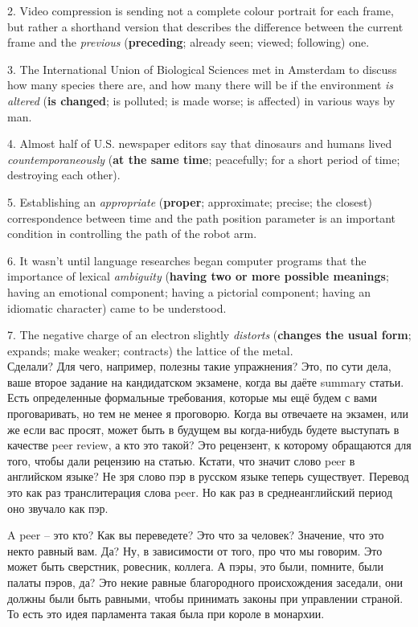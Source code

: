 \documentclass[main.tex]{subfiles}
\begin{document}
2. Video compression is sending not a complete colour portrait for each frame, but rather a shorthand version that describes the difference between the current frame and the \textit{previous} (\textbf{preceding}; already seen; viewed; following) one.

3. The International Union of Biological Sciences met in Amsterdam to discuss how many species there are, and how many there will be if the environment \textit{is altered} (\textbf{is changed}; is polluted; is made worse; is affected) in various ways by man. 

4. Almost half of U.S. newspaper editors say that dinosaurs and humans lived \textit{countemporaneously} (\textbf{at the same time}; peacefully; for a short period of time; destroying each other).

5. Establishing an \textit{appropriate} (\textbf{proper}; approximate; precise; the closest) correspondence between time and the path position parameter is an important condition in controlling the path of the robot arm.

6. It wasn't until language researches began computer programs that the importance of lexical \textit{ambiguity} (\textbf{having two or more possible meanings}; having an emotional component; having a pictorial component; having an idiomatic character) came to be understood.

7. The negative charge of an electron slightly \textit{distorts} (\textbf{changes the usual form}; expands; make weaker; contracts) the lattice of the metal.
\\

Сделали?
Для чего, например, полезны такие упражнения?
Это, по сути дела, ваше второе задание на кандидатском экзамене, когда вы даёте summary статьи.
Есть определенные формальные требования, которые мы ещё будем с вами проговаривать, но тем не менее я проговорю.
Когда вы отвечаете на экзамен, или же если вас просят, может быть в будущем вы когда-нибудь будете выступать в качестве peer review, а кто это такой?
Это рецензент, к которому обращаются для того, чтобы дали рецензию на статью.
Кстати, что значит слово peer в английском языке?
Не зря слово пэр в русском языке теперь существует.
Перевод это как раз транслитерация слова peer.
Но как раз в среднеанглийский период оно звучало как пэр.

A peer -- это кто?
Как вы переведете?
Это что за человек?
Значение, что это некто равный вам.
Да?
Ну, в зависимости от того, про что мы говорим.
Это может быть сверстник, ровесник, коллега.
А пэры, это были, помните, были палаты пэров, да?
Это некие равные благородного происхождения заседали, они должны были быть равными, чтобы принимать законы при управлении страной.
То есть это идея парламента такая была при короле в монархии.
\end{document}

